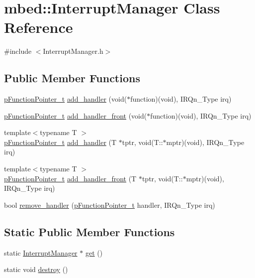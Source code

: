 \hypertarget{classmbed_1_1InterruptManager}{}\section{mbed\+:\+:Interrupt\+Manager Class Reference}
\label{classmbed_1_1InterruptManager}


{\ttfamily \#include $<$Interrupt\+Manager.\+h$>$}

\subsection*{Public Member Functions}
\begin{DoxyCompactItemize}
\item 
\hyperlink{classmbed_1_1FunctionPointerArg1}{p\+Function\+Pointer\+\_\+t} \hyperlink{classmbed_1_1InterruptManager_a17e717ff89d096a000f674b46ca7e849}{add\+\_\+handler} (void($\ast$function)(void), I\+R\+Qn\+\_\+\+Type irq)
\item 
\hyperlink{classmbed_1_1FunctionPointerArg1}{p\+Function\+Pointer\+\_\+t} \hyperlink{classmbed_1_1InterruptManager_ad7250442830a84d34ee2fcd84664fe9d}{add\+\_\+handler\+\_\+front} (void($\ast$function)(void), I\+R\+Qn\+\_\+\+Type irq)
\item 
{\footnotesize template$<$typename T $>$ }\\\hyperlink{classmbed_1_1FunctionPointerArg1}{p\+Function\+Pointer\+\_\+t} \hyperlink{classmbed_1_1InterruptManager_aa964e760de62ab08711dcaae40732649}{add\+\_\+handler} (T $\ast$tptr, void(T\+::$\ast$mptr)(void), I\+R\+Qn\+\_\+\+Type irq)
\item 
{\footnotesize template$<$typename T $>$ }\\\hyperlink{classmbed_1_1FunctionPointerArg1}{p\+Function\+Pointer\+\_\+t} \hyperlink{classmbed_1_1InterruptManager_a9fb2a44246203de940e58ed9f696d872}{add\+\_\+handler\+\_\+front} (T $\ast$tptr, void(T\+::$\ast$mptr)(void), I\+R\+Qn\+\_\+\+Type irq)
\item 
bool \hyperlink{classmbed_1_1InterruptManager_a298699ba52acb35e8ed07cff1c31744f}{remove\+\_\+handler} (\hyperlink{classmbed_1_1FunctionPointerArg1}{p\+Function\+Pointer\+\_\+t} handler, I\+R\+Qn\+\_\+\+Type irq)
\end{DoxyCompactItemize}
\subsection*{Static Public Member Functions}
\begin{DoxyCompactItemize}
\item 
static \hyperlink{classmbed_1_1InterruptManager}{Interrupt\+Manager} $\ast$ \hyperlink{classmbed_1_1InterruptManager_a02c7c6ec7c6a1ce0ec82d85b7648d28c}{get} ()
\item 
static void \hyperlink{classmbed_1_1InterruptManager_a39fe3c021afee8a248309a2a6034b8df}{destroy} ()
\end{DoxyCompactItemize}


